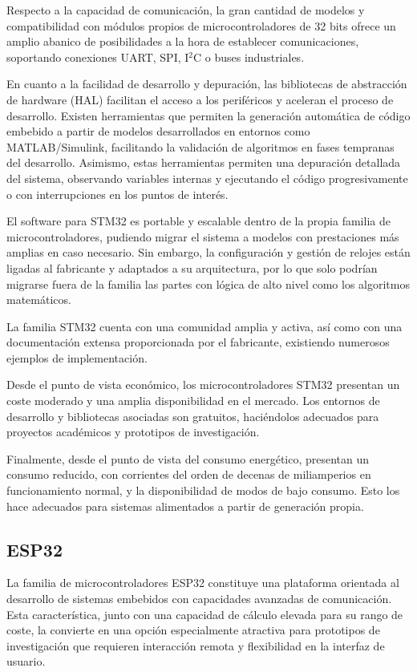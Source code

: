 Respecto a la capacidad de comunicación, la gran cantidad de modelos y compatibilidad con módulos propios de microcontroladores de 32 bits ofrece un amplio abanico de posibilidades a la hora de establecer comunicaciones, soportando conexiones UART, SPI, I$^2$C o buses industriales. 

En cuanto a la facilidad de desarrollo y depuración, las bibliotecas de abstracción de hardware (HAL) facilitan el acceso a los periféricos y aceleran el proceso de desarrollo. Existen herramientas que permiten la generación automática de código embebido a partir de modelos desarrollados en entornos como MATLAB/Simulink, facilitando la validación de algoritmos en fases tempranas del desarrollo. Asimismo, estas herramientas permiten una depuración detallada del sistema, observando variables internas y ejecutando el código progresivamente o con interrupciones en los puntos de interés.

El software para STM32 es portable y escalable dentro de la propia familia de microcontroladores, pudiendo migrar el sistema a modelos con prestaciones más amplias en caso necesario. Sin embargo, la configuración y gestión de relojes están ligadas al fabricante y adaptados a su arquitectura, por lo que solo podrían migrarse fuera de la familia las partes con lógica de alto nivel como los algoritmos matemáticos.

La familia STM32 cuenta con una comunidad amplia y activa, así como con una documentación extensa proporcionada por el fabricante, existiendo numerosos ejemplos de implementación.

Desde el punto de vista económico, los microcontroladores STM32 presentan un coste moderado y una amplia disponibilidad en el mercado. Los entornos de desarrollo y bibliotecas asociadas son gratuitos, haciéndolos adecuados para proyectos académicos y prototipos de investigación.


Finalmente, desde el punto de vista del consumo energético, presentan un consumo reducido, con corrientes del orden de decenas de miliamperios en funcionamiento normal, y la disponibilidad de modos de bajo consumo. Esto los hace adecuados para sistemas alimentados a partir de generación propia.
 
\subsection{ESP32}

La familia de microcontroladores ESP32 constituye una plataforma orientada al desarrollo de sistemas embebidos con capacidades avanzadas de comunicación. Esta característica, junto con una capacidad de cálculo elevada para su rango de coste, la convierte en una opción especialmente atractiva para prototipos de investigación que requieren interacción remota y flexibilidad en la interfaz de usuario. 

